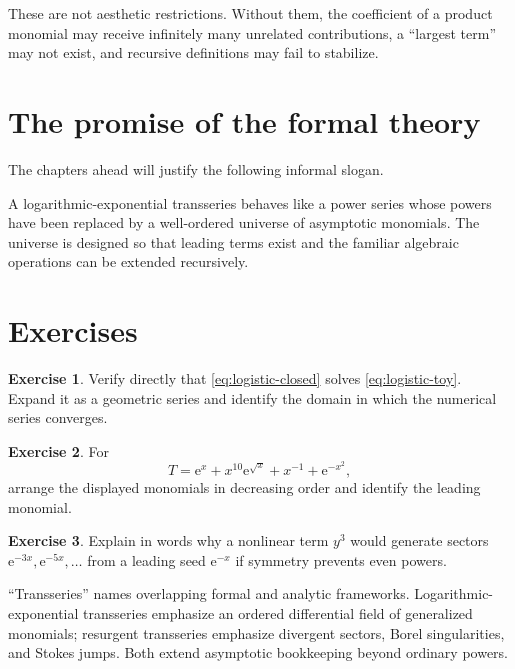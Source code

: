 \documentclass[11pt,openany]{book}
\theoremstyle{definition}
\newtheorem{exercise}{Exercise}[chapter]
\theoremstyle{plain}
\theoremstyle{remark}
\newcommand{\e}{\mathrm{e}}
\begin{document}
These are not aesthetic restrictions. Without them, the coefficient of a product monomial may receive infinitely many unrelated contributions, a ``largest term'' may not exist, and recursive definitions may fail to stabilize.

\section{The promise of the formal theory}

The chapters ahead will justify the following informal slogan.

\begin{checkpointbox}
A logarithmic-exponential transseries behaves like a power series whose powers have been replaced by a well-ordered universe of asymptotic monomials. The universe is designed so that leading terms exist and the familiar algebraic operations can be extended recursively.
\end{checkpointbox}

\section{Exercises}

\begin{exercise}
Verify directly that \cref{eq:logistic-closed} solves \cref{eq:logistic-toy}. Expand it as a geometric series and identify the domain in which the numerical series converges.
\end{exercise}

\begin{exercise}
For
\[
 T=\e^{x}+x^{10}\e^{\sqrt{x}}+x^{-1}+\e^{-x^2},
\]
arrange the displayed monomials in decreasing order and identify the leading monomial.
\end{exercise}

\begin{exercise}
Explain in words why a nonlinear term $y^3$ would generate sectors $\e^{-3x},\e^{-5x},\ldots$ from a leading seed $\e^{-x}$ if symmetry prevents even powers.
\end{exercise}

\begin{summarybox}
``Transseries'' names overlapping formal and analytic frameworks. Logarithmic-exponential transseries emphasize an ordered differential field of generalized monomials; resurgent transseries emphasize divergent sectors, Borel singularities, and Stokes jumps. Both extend asymptotic bookkeeping beyond ordinary powers.
\end{summarybox}
\end{document}
